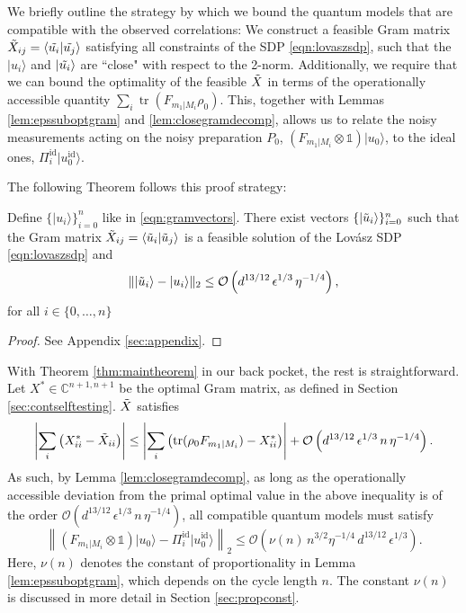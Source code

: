 We briefly outline the strategy by which we bound the quantum models that are compatible with the observed correlations: We construct a feasible Gram matrix $\Tilde{X}_{ij}=\langle \Tilde{u_i}\vert \Tilde{u_j}\rangle$ satisfying all constraints of the SDP \ref{eqn:lovaszsdp}, such that the $\vert u_i \rangle$ and $\vert \Tilde{u_i}\rangle$ are ``close" with respect to the 2-norm. Additionally, we require that we can bound the optimality of the feasible $\Tilde{X}$ in terms of the operationally accessible quantity $\sum_i \operatorname{tr}(F_{m_1\vert M_i}\rho_0)$. This, together with Lemmas \ref{lem:epssuboptgram} and \ref{lem:closegramdecomp}, allows us to relate the noisy measurements acting on the noisy preparation $P_0$, $(F_{m_1\vert M_i}\otimes \mathbb{1})\vert u_0 \rangle$, to the ideal ones, $\Pi_i^{\text{id}}\vert u_0^{\text{id}}\rangle$. 

The following Theorem follows this proof strategy:
\begin{theorem}
\label{thm:maintheorem}
Define $\{\vert u_i \rangle \}_{i=0}^n$ like in \ref{eqn:gramvectors}. There exist vectors $\{\vert \Tilde{u}_i \rangle \}_{i=0}^n$ such that the Gram matrix $\Tilde{X}_{ij}=\langle \Tilde{u}_i\vert \Tilde{u}_j \rangle$ is a feasible solution of the Lovász SDP \ref{eqn:lovaszsdp} and
\begin{equation*}
\|\vert \Tilde{u}_i \rangle - \vert u_i \rangle \|_2 \leq \mathcal{O}\left(d^{13/12}\,\epsilon^{1/3}\,\eta^{-1/4}\right),
\end{equation*}
for all $i\in\{0,\dots,n\}$
\end{theorem}
\begin{proof}
See Appendix \ref{sec:appendix}.
\end{proof}

With Theorem \ref{thm:maintheorem} in our back pocket, the rest is straightforward.
Let $X^{*}\in\mathbb{C}^{n+1,n+1}$ be the optimal Gram matrix, as defined in Section \ref{sec:contselftesting}. $\Tilde{X}$ satisfies \[\left|\sum_i \left(X^{*}_{ii} - \Tilde{X}_{ii}\right)\right| \leq \left|\sum_i\left(\operatorname{tr}(\rho_0 F_{m_1\vert M_i})-X^*_{ii}\right)\right|+\mathcal{O}\left(d^{13/12}\,\epsilon^{1/3}\,n\,\eta^{-1/4}\right).\]
As such, by Lemma \ref{lem:closegramdecomp}, as long as the operationally accessible deviation from the primal optimal value in the above inequality is of the order $\mathcal{O}\left(d^{13/12}\,\epsilon^{1/3}\,n\,\eta^{-1/4}\right)$, all compatible quantum models must satisfy \[\left\|( F_{m_1\vert M_i}\otimes \mathbb{1})\vert u_0 \rangle - \Pi_i^{\text{id}}\vert u_0^{\text{id}} \rangle \right\|_2\leq \mathcal{O}\left(\nu(n)\, n^{3/2}\eta^{-1/4}\,d^{13/12}\,\epsilon^{1/3}\right).\]
Here, $\nu(n)$ denotes the constant of proportionality in Lemma \ref{lem:epssuboptgram}, which depends on the cycle length $n$. The constant $\nu(n)$ is discussed in more detail in Section \ref{sec:propconst}.